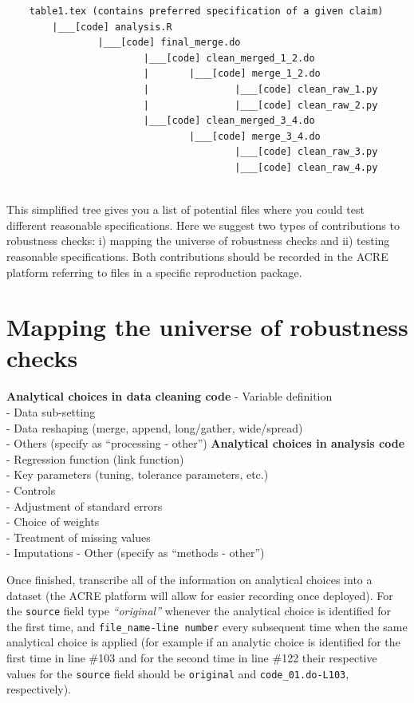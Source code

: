 \documentclass[]{book}
\begin{document}
\begin{verbatim}
    table1.tex (contains preferred specification of a given claim)
        |___[code] analysis.R
                |___[code] final_merge.do
                        |___[code] clean_merged_1_2.do
                        |       |___[code] merge_1_2.do
                        |               |___[code] clean_raw_1.py
                        |               |___[code] clean_raw_2.py
                        |___[code] clean_merged_3_4.do
                                |___[code] merge_3_4.do
                                        |___[code] clean_raw_3.py
                                        |___[code] clean_raw_4.py
                                        
\end{verbatim}

This simplified tree gives you a list of potential files where you could test different reasonable specifications. Here we suggest two types of contributions to robustness checks: i) mapping the universe of robustness checks and ii) testing reasonable specifications. Both contributions should be recorded in the ACRE platform referring to files in a specific reproduction package.

\hypertarget{mapping-the-universe-of-robustness-checks}{%
\section{Mapping the universe of robustness checks}\label{mapping-the-universe-of-robustness-checks}}

\textbf{Analytical choices in data cleaning code}
- Variable definition\\
- Data sub-setting\\
- Data reshaping (merge, append, long/gather, wide/spread)\\
- Others (specify as ``processing - other'')
\textbf{Analytical choices in analysis code}
- Regression function (link function)\\
- Key parameters (tuning, tolerance parameters, etc.)\\
- Controls\\
- Adjustment of standard errors\\
- Choice of weights\\
- Treatment of missing values\\
- Imputations
- Other (specify as ``methods - other'')

Once finished, transcribe all of the information on analytical choices into a dataset (the ACRE platform will allow for easier recording once deployed). For the \texttt{source} field type \emph{``original''} whenever the analytical choice is identified for the first time, and \texttt{file\_name-line\ number} every subsequent time when the same analytical choice is applied (for example if an analytic choice is identified for the first time in line \#103 and for the second time in line \#122 their respective values for the \texttt{source} field should be \texttt{original} and \texttt{code\_01.do-L103}, respectively).
\end{document}
